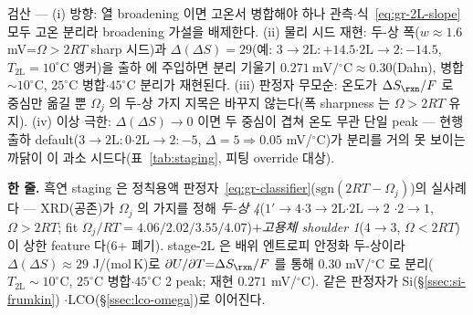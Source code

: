 \begin{verifybox}
검산 --- (i) 방향: 열 broadening 이면 고온서 병합해야 하나 관측$\cdot$식~\eqref{eq:gr-2L-slope} 모두 고온 분리라
broadening 가설을 배제한다. (ii) 물리 시드 재현: 두-상 폭($w\!\approx\!1.6$ mV=$\Omega>2RT$ sharp 시드)과
$\Delta(\Delta S){=}29$(예: $3\!\to\!2\mathrm L{:}+14.5$$\cdot$$2\mathrm L\!\to\!2{:}-14.5$, $T_{\mathrm{2L}}{=}10^\circ$C
앵커)을 출하  에 주입하면 분리 기울기 $0.271\ \mathrm{mV/{}^\circ C}\approx0.30$(Dahn),
병합 $\sim\!10^\circ$C, $25^\circ$C 병합$\cdot$$45^\circ$C 분리가 재현된다. (iii) 판정자 무모순: 온도가
$\Delta S_\rxn/F$ 로 중심만 옮길 뿐 $\Omega_j$ 의 두-상 가지 지목은 바꾸지 않는다(폭 sharpness 는
$\Omega>2RT$ 유지). (iv) 이상 극한: $\Delta(\Delta S)\!\to\!0$ 이면 두 중심이 겹쳐 온도 무관 단일 peak ---
현행 출하 default($3\!\to\!2\mathrm L{:}0$$\cdot$$2\mathrm L\!\to\!2{:}-5$, $\Delta{=}5\!\Rightarrow\!0.05$
mV/$^\circ$C)가 분리를 거의 못 보이는 까닭이 이 과소 시드다(표~\ref{tab:staging}, 피팅 override 대상).
\end{verifybox}

\begin{keybox}
\textbf{한 줄.} 흑연 staging 은 정칙용액 판정자~\eqref{eq:gr-classifier}($\mathrm{sgn}(2RT-\Omega_j)$)의 실사례다
--- XRD(공존)가 $\Omega_j$ 의 가지를 정해 \emph{두-상 4}($1'\!\to\!4$$\cdot$$3\!\to\!2\mathrm L$$\cdot$$2\mathrm L\!\to\!2$
$\cdot$$2\!\to\!1$, $\Omega>2RT$; fit $\Omega_j/RT{=}4.06/2.02/3.55/4.07$)$+$\emph{고용체 shoulder 1}($4\!\to\!3$,
$\Omega<2RT$)이 상한 feature 다(6+ 폐기). stage-2L 은 배위 엔트로피 안정화 두-상이라 $\Delta(\Delta S){\approx}29$
J/(mol\,K)로 $\partial U/\partial T{=}\Delta S_\rxn/F$ 를 통해 $0.30$ mV/$^\circ$C 로 분리($T_{\mathrm{2L}}{\sim}10^\circ$C,
$25^\circ$C 병합$\cdot$$45^\circ$C 2 peak; 재현 $0.271$ mV/$^\circ$C). 같은 판정자가 Si(\S\ref{ssec:si-frumkin})
$\cdot$LCO(\S\ref{ssec:lco-omega})로 이어진다.
\end{keybox}

